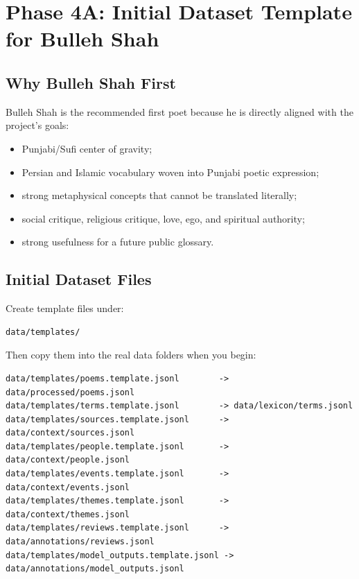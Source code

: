 \documentclass[11pt]{article}
\begin{document}
\section{Phase 4A: Initial Dataset Template for Bulleh Shah}

\subsection{Why Bulleh Shah First}

Bulleh Shah is the recommended first poet because he is directly aligned with the
project's goals:

\begin{itemize}
  \item Punjabi/Sufi center of gravity;
  \item Persian and Islamic vocabulary woven into Punjabi poetic expression;
  \item strong metaphysical concepts that cannot be translated literally;
  \item social critique, religious critique, love, ego, and spiritual authority;
  \item strong usefulness for a future public glossary.
\end{itemize}

\subsection{Initial Dataset Files}

Create template files under:

\begin{verbatim}
data/templates/
\end{verbatim}

Then copy them into the real data folders when you begin:

\begin{verbatim}
data/templates/poems.template.jsonl        -> data/processed/poems.jsonl
data/templates/terms.template.jsonl        -> data/lexicon/terms.jsonl
data/templates/sources.template.jsonl      -> data/context/sources.jsonl
data/templates/people.template.jsonl       -> data/context/people.jsonl
data/templates/events.template.jsonl       -> data/context/events.jsonl
data/templates/themes.template.jsonl       -> data/context/themes.jsonl
data/templates/reviews.template.jsonl      -> data/annotations/reviews.jsonl
data/templates/model_outputs.template.jsonl -> data/annotations/model_outputs.jsonl
\end{verbatim}
\end{document}
